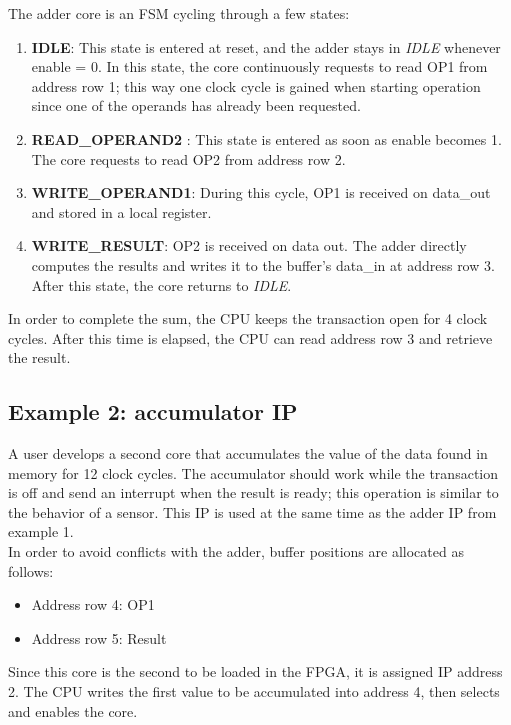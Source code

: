 The adder core is an FSM cycling through a few states:
\begin{enumerate}
	\item \textbf{IDLE}: This state is entered at reset, and the adder stays in \textit{IDLE} whenever enable = 0. In this state, the core continuously requests to read OP1 from address row 1; this way one clock cycle is gained when starting operation since one of the operands has already been requested.

	\item \textbf{READ\_OPERAND2} : This state is entered as soon as enable becomes 1. The core requests to read OP2 from address row 2.

	\item\textbf{ WRITE\_OPERAND1}: During this cycle, OP1 is received on data\_out and stored in a local register.

	\item \textbf{WRITE\_RESULT}: OP2 is received on data out. The adder directly computes the results and writes it to the buffer's data\_in at address row 3. After this state, the core returns to \textit{IDLE}.
\end{enumerate}
In order to complete the sum, the CPU keeps the transaction open for 4 clock cycles. After this time is elapsed, the CPU can read address row 3 and retrieve the result. 

\subsection{Example 2: accumulator IP}

A user develops a second core that accumulates the value of the data found in memory for 12 clock cycles. The accumulator should work while the transaction is off and send an interrupt when the result is ready; this operation is similar to the behavior of a sensor. This IP is used at the same time as the adder IP from example 1.\\
In order to avoid conflicts with the adder, buffer positions are allocated as follows:

\begin{itemize}
\item Address row 4: OP1 
\item Address row 5: Result
\end{itemize}


Since this core is the second to be loaded in the FPGA, it is assigned IP address 2. The CPU writes the first value to be accumulated into address 4, then selects and enables the core. \\
\bigskip

